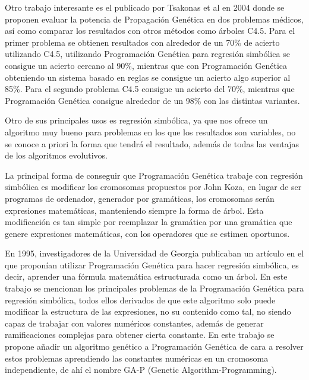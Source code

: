 Otro trabajo interesante es el publicado por Tsakonas et al en 2004 \cite{reglasDosDominiosMedicosComparacion} donde se proponen evaluar la potencia de Propagación Genética en dos problemas médicos, así como comparar los resultados con otros métodos como árboles C4.5. Para el primer problema se obtienen resultados con alrededor de un 70\% de acierto utilizando C4.5, utilizando Programación Genética para regresión simbólica se consigue un acierto cercano al 90\%, mientras que con Programación Genética obteniendo un sistema basado en reglas se consigue un acierto algo superior al 85\%. Para el segundo problema C4.5 consigue un acierto del 70\%, mientras que Programación Genética consigue alrededor de un 98\% con las distintas variantes.


Otro de sus principales usos es regresión simbólica, ya que nos ofrece un algoritmo muy bueno para problemas en los que los resultados son variables, no se conoce a priori la forma que tendrá el resultado, además de todas las ventajas de los algoritmos evolutivos.

La principal forma de conseguir que Programación Genética trabaje con regresión simbólica es modificar los cromosomas propuestos por John Koza, en lugar de ser programas de ordenador, generador por gramáticas, los cromosomas serán expresiones matemáticas, manteniendo siempre la forma de árbol. Esta modificación es tan simple por reemplazar la gramática por una gramática que genere expresiones matemáticas, con los operadores que se estimen oportunos.

En 1995, investigadores de la Universidad de Georgia publicaban un artículo \cite{primerGAP} en el que proponían utilizar Programación Genética para hacer regresión simbólica, es decir, aprender una fórmula matemática estructurada como un árbol. En este trabajo se mencionan los principales problemas de la Programación Genética para regresión simbólica, todos ellos derivados de que este algoritmo solo puede modificar la estructura de las expresiones, no su contenido como tal, no siendo capaz de trabajar con valores numéricos constantes, además de generar ramificaciones complejas para obtener cierta constante. En este trabajo se propone añadir un algoritmo genético a Programación Genética de cara a resolver estos problemas aprendiendo las constantes numéricas en un cromosoma independiente, de ahí el nombre GA-P (Genetic Algorithm-Programming).

